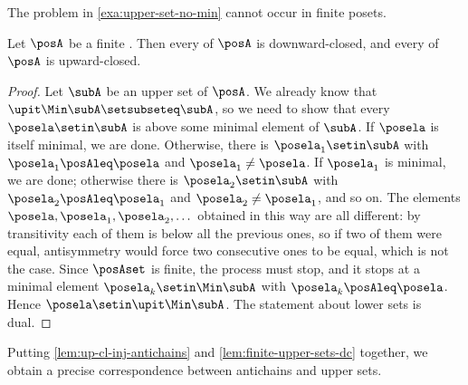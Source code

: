 The problem in \cref{exa:upper-set-no-min} cannot occur in finite posets.

\begin{lemma}
    \label{lem:finite-upper-sets-dc}
    Let $\posA$ be a finite .
    Then every  of $\posA$ is downward-closed, and every  of $\posA$ is upward-closed.
\end{lemma}
\begin{proof}
    Let $\subA$ be an upper set of $\posA$.
    We already know that $\upit \Min \subA \setsubseteq \subA$, so we need to show that every $\posela \setin \subA$ is above some minimal element of $\subA$.
    If $\posela$ is itself minimal, we are done.
    Otherwise, there is $\posela_1 \setin \subA$ with $\posela_1 \posAleq \posela$ and $\posela_1 \neq \posela$.
    If $\posela_1$ is minimal, we are done; otherwise there is $\posela_2 \setin \subA$ with $\posela_2 \posAleq \posela_1$ and $\posela_2 \neq \posela_1$, and so on.
    The elements $\posela, \posela_1, \posela_2, \dots$ obtained in this way are all different: by transitivity each of them is below all the previous ones, so if two of them were equal, antisymmetry would force two consecutive ones to be equal, which is not the case.
    Since $\posAset$ is finite, the process must stop, and it stops at a minimal element $\posela_k \setin \Min \subA$ with $\posela_k \posAleq \posela$.
    Hence $\posela \setin \upit \Min \subA$.
    The statement about lower sets is dual.
\end{proof}

Putting \cref{lem:up-cl-inj-antichains} and \cref{lem:finite-upper-sets-dc} together, we obtain a precise correspondence between antichains and upper sets.

